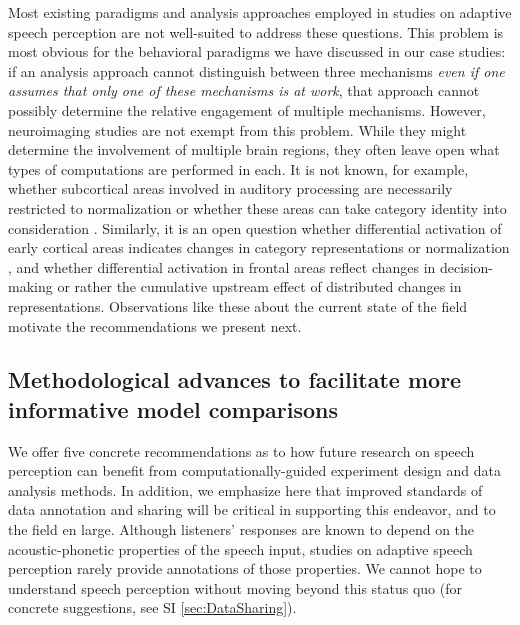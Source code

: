 \documentclass[
  11pt,
  man,floatsintext]{apa6}
\begin{document}
Most existing paradigms and analysis approaches employed in studies on adaptive speech perception are not well-suited to address these questions. This problem is most obvious for the behavioral paradigms we have discussed in our case studies: if an analysis approach cannot distinguish between three mechanisms \emph{even if one assumes that only one of these mechanisms is at work}, that approach cannot possibly determine the relative engagement of multiple mechanisms. However, neuroimaging studies are not exempt from this problem. While they might determine the involvement of multiple brain regions, they often leave open what types of computations are performed in each. It is not known, for example, whether subcortical areas involved in auditory processing are necessarily restricted to normalization or whether these areas can take category identity into consideration \autocite[e.g., through documented feedback projections from cortical areas,][]{Erb2013}. Similarly, it is an open question whether differential activation of early cortical areas indicates changes in category representations or normalization \autocite[e.g., the involvement of Heschl's gyrus in adaptive speech perception,][]{sjerps2019}, and whether differential activation in frontal areas reflect changes in decision-making \autocite[as seems to be assumed in, e.g.,][]{myers-mesite2014} or rather the cumulative upstream effect of distributed changes in representations. Observations like these about the current state of the field motivate the recommendations we present next.

\subsection{Methodological advances to facilitate more informative model comparisons}\label{sec:methodological-advances}

We offer five concrete recommendations as to how future research on speech perception can benefit from computationally-guided experiment design and data analysis methods. In addition, we emphasize here that improved standards of data annotation and sharing will be critical in supporting this endeavor, and to the field en large. Although listeners' responses are known to depend on the acoustic-phonetic properties of the speech input, studies on adaptive speech perception rarely provide annotations of those properties. We cannot hope to understand speech perception without moving beyond this status quo (for concrete suggestions, see SI \ref{sec:DataSharing}).
\end{document}
